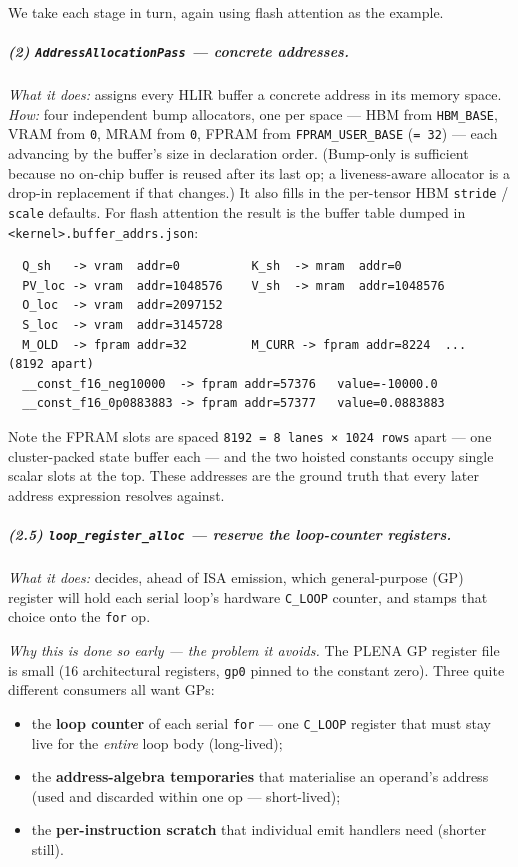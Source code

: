 \documentclass[
  10pt,
]{article}
\providecommand{\tightlist}{%
  \setlength{\itemsep}{0pt}\setlength{\parskip}{0pt}}
\begin{document}
We take each stage in turn, again using flash attention as the example.

\subparagraph{(2) \texttt{AddressAllocationPass} --- concrete
addresses.}\label{be-addr} \emph{What it does:} assigns every HLIR buffer
a concrete address in its memory space. \emph{How:} four independent
bump allocators, one per space --- HBM from \texttt{HBM\_BASE}, VRAM from
\texttt{0}, MRAM from \texttt{0}, FPRAM from \texttt{FPRAM\_USER\_BASE}
(\texttt{= 32}) --- each advancing by the buffer's size in declaration
order. (Bump-only is sufficient because no on-chip buffer is reused after
its last op; a liveness-aware allocator is a drop-in replacement if that
changes.) It also fills in the per-tensor HBM \texttt{stride} / \texttt{scale}
defaults. For flash attention the result is the buffer table dumped in
\texttt{<kernel>.buffer\_addrs.json}:

\begin{verbatim}
  Q_sh   -> vram  addr=0          K_sh  -> mram  addr=0
  PV_loc -> vram  addr=1048576    V_sh  -> mram  addr=1048576
  O_loc  -> vram  addr=2097152
  S_loc  -> vram  addr=3145728
  M_OLD  -> fpram addr=32         M_CURR -> fpram addr=8224  ...  (8192 apart)
  __const_f16_neg10000  -> fpram addr=57376   value=-10000.0
  __const_f16_0p0883883 -> fpram addr=57377   value=0.0883883
\end{verbatim}

Note the FPRAM slots are spaced \texttt{8192 = 8 lanes × 1024 rows}
apart --- one cluster-packed state buffer each --- and the two hoisted
constants occupy single scalar slots at the top. These addresses are the
ground truth that every later address expression resolves against.

\subparagraph{(2.5) \texttt{loop\_register\_alloc} --- reserve the
loop-counter registers.}\label{be-loopreg} \emph{What it does:} decides,
ahead of ISA emission, which general-purpose (GP) register will hold each
serial loop's hardware \texttt{C\_LOOP} counter, and stamps that choice
onto the \texttt{for} op.

\emph{Why this is done so early --- the problem it avoids.} The PLENA GP
register file is small (16 architectural registers, \texttt{gp0} pinned
to the constant zero). Three quite different consumers all want GPs:

\begin{itemize}
\tightlist
\item
  the \textbf{loop counter} of each serial \texttt{for} --- one
  \texttt{C\_LOOP} register that must stay live for the \emph{entire}
  loop body (long-lived);
\item
  the \textbf{address-algebra temporaries} that materialise an operand's
  address (used and discarded within one op --- short-lived);
\item
  the \textbf{per-instruction scratch} that individual emit handlers
  need (shorter still).
\end{itemize}
\end{document}
